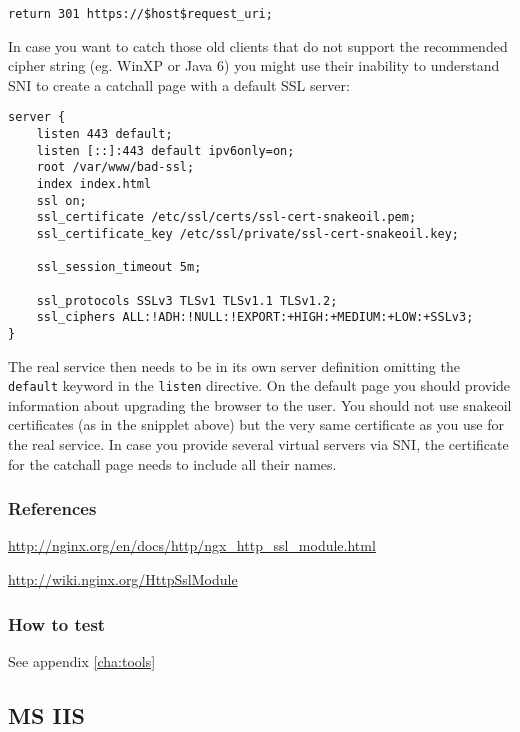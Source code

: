 \begin{lstlisting}
return 301 https://$host$request_uri;
\end{lstlisting}

In case you want to catch those old clients that do not support the recommended
cipher string (eg. WinXP or Java 6) you might use their inability to understand
SNI to create a catchall page with a default SSL server:

\begin{lstlisting}
server {
    listen 443 default;
    listen [::]:443 default ipv6only=on;
    root /var/www/bad-ssl;
    index index.html
    ssl on;
    ssl_certificate /etc/ssl/certs/ssl-cert-snakeoil.pem;
    ssl_certificate_key /etc/ssl/private/ssl-cert-snakeoil.key;

    ssl_session_timeout 5m;

    ssl_protocols SSLv3 TLSv1 TLSv1.1 TLSv1.2;
    ssl_ciphers ALL:!ADH:!NULL:!EXPORT:+HIGH:+MEDIUM:+LOW:+SSLv3;
}
\end{lstlisting}

The real service then needs to be in its own server definition omitting the
\texttt{default} keyword in the \texttt{listen} directive. On the default page
you should provide information about upgrading the browser to the user. You
should not use snakeoil certificates (as in the snipplet above) but the very
same certificate as you use for the real service. In case you provide several
virtual servers via SNI, the certificate for the catchall page needs to include
all their names.

\subsubsection{References} 
\begin{itemize*}
  \item \url{http://nginx.org/en/docs/http/ngx_http_ssl_module.html}
  \item \url{http://wiki.nginx.org/HttpSslModule}
\end{itemize*}

\subsubsection{How to test}
See appendix \ref{cha:tools}


\subsection{MS IIS}
\label{sec:ms-iis}


